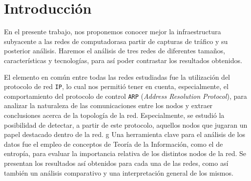 
\section{Introducción}

En el presente trabajo, nos proponemos conocer mejor la infraestructura
subyacente a las redes de computadorasa partir de capturas de tráfico y su posterior análisis.
Haremos el análisis de tres
redes de diferentes tamaños, características y tecnologías, para así poder
contrastar los resultados obtenidos.

El elemento en común entre todas las redes estudiadas fue la utilización del
protocolo de red \texttt{IP}, lo cual nos permitió tener en cuenta,
especialmente, el comportamiento del protocolo de control \texttt{ARP}
(\textit{Address Resolution Protocol}), para analizar la naturaleza de las
comunicaciones entre los nodos y extraer conclusiones acerca de la topología
de la red. Especialmente, se estudió la posibilidad de detectar, a partir de
este protocolo, aquellos nodos que jugaran un papel destacado dentro de la
red.
g
Una herramienta clave para el análisis de los datos fue el empleo de conceptos
de Teoría de la Información, como el de entropía, para evaluar la importancia
relativa de los distintos nodos de la red. Se presentan los resultados así
obtenidos para cada una de las redes, como así también un análisis comparativo
y una interpretación general de los mismos.
